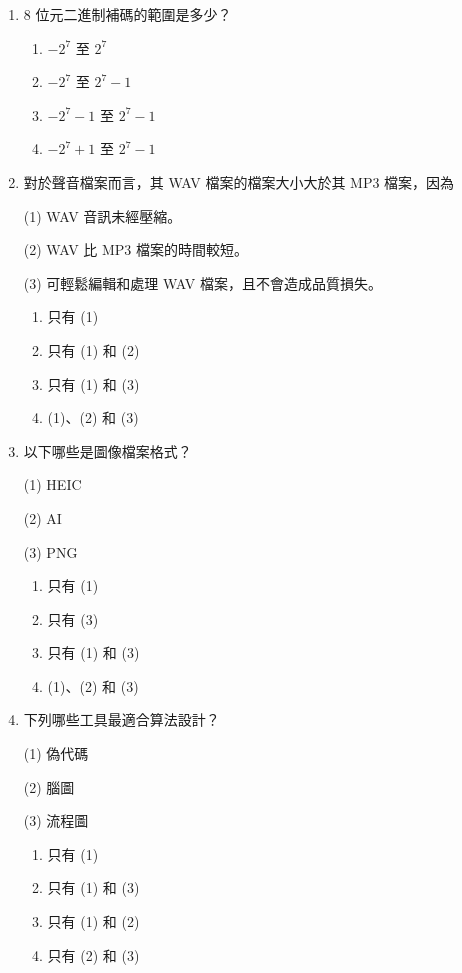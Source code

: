 \documentclass[12pt,a4paper]{article}
\begin{document}
\begin{enumerate}
\item 8 位元二進制補碼的範圍是多少？

\begin{enumerate}[label=\Alph*.]
\item $-2^7$ 至 $2^7$
\item $-2^7$ 至 $2^7 - 1$
\item $-2^7 - 1$ 至 $2^7 - 1$
\item $-2^7 + 1$ 至 $2^7 - 1$
\end{enumerate}

\item 對於聲音檔案而言，其 WAV 檔案的檔案大小大於其 MP3 檔案，因為

(1) WAV 音訊未經壓縮。

(2) WAV 比 MP3 檔案的時間較短。

(3) 可輕鬆編輯和處理 WAV 檔案，且不會造成品質損失。

\begin{enumerate}[label=\Alph*.]
\item 只有 (1)
\item 只有 (1) 和 (2)
\item 只有 (1) 和 (3)
\item (1)、(2) 和 (3)
\end{enumerate}

\item 以下哪些是圖像檔案格式？

(1) HEIC

(2) AI

(3) PNG

\begin{enumerate}[label=\Alph*.]
\item 只有 (1)
\item 只有 (3)
\item 只有 (1) 和 (3)
\item (1)、(2) 和 (3)
\end{enumerate}

\item 下列哪些工具最適合算法設計？

(1) 偽代碼

(2) 腦圖

(3) 流程圖

\begin{enumerate}[label=\Alph*.]
\item 只有 (1)
\item 只有 (1) 和 (3)
\item 只有 (1) 和 (2)
\item 只有 (2) 和 (3)
\end{enumerate}


\end{enumerate}
\end{document}
